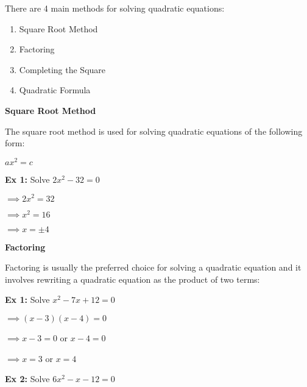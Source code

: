 \documentclass[12pt]{article}
\newenvironment{myindentpar}[1]%
     {\begin{list}{}%
             {\setlength{\leftmargin}{#1}}%
             \item[]%
     }
     {\end{list}}
\begin{document}
\begin{myindentpar}{1cm}

There are 4 main methods for solving quadratic equations:


\begin{enumerate}
\item Square Root Method

\item Factoring

\item Completing the Square

\item Quadratic Formula
\end{enumerate}


\begin{enumerate}
\item \textbf{Square Root Method}

\begin{myindentpar}{1cm}

The square root method is used for solving quadratic equations of the following form:
\newline

\centerline{$ax^2 = c$}

\textbf{Ex 1:} Solve $2x^2 - 32 = 0$

\hspace{.8cm} $\implies 2x^2 = 32$

\hspace{.8cm} $\implies x^2 = 16$

\hspace{.8cm} $\implies x = \pm 4$
\end{myindentpar}

\item \textbf{Factoring}

Factoring is usually the preferred choice for solving a quadratic equation and it involves rewriting a quadratic equation as the product of two terms:

\textbf{Ex 1:} Solve $x^2 - 7x + 12 = 0$

$\implies (x - 3)(x-4) = 0$

$\implies x - 3 = 0$ \hspace{1cm} or \hspace{1cm} $x - 4 = 0$

$\implies x = 3$ \hspace{1.7cm} or \hspace{1cm}  $x  = 4$

\textbf{Ex 2:} Solve $6x^2 - x - 12 = 0$


\end{enumerate}
\end{myindentpar}
\end{document}
